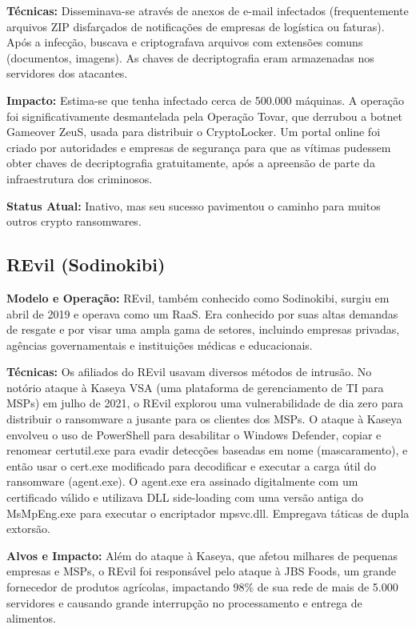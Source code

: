\textbf{Técnicas:} Disseminava-se através de anexos de e-mail infectados (frequentemente arquivos ZIP disfarçados de notificações de empresas de logística ou faturas). Após a infecção, buscava e criptografava arquivos com extensões comuns (documentos, imagens). As chaves de decriptografia eram armazenadas nos servidores dos atacantes.

\textbf{Impacto:} Estima-se que tenha infectado cerca de 500.000 máquinas. A operação foi significativamente desmantelada pela Operação Tovar, que derrubou a botnet Gameover ZeuS, usada para distribuir o CryptoLocker. Um portal online foi criado por autoridades e empresas de segurança para que as vítimas pudessem obter chaves de decriptografia gratuitamente, após a apreensão de parte da infraestrutura dos criminosos.

\textbf{Status Atual:} Inativo, mas seu sucesso pavimentou o caminho para muitos outros crypto ransomwares.

\subsection{REvil (Sodinokibi)}
\textbf{Modelo e Operação:} REvil, também conhecido como Sodinokibi, surgiu em abril de 2019 e operava como um RaaS. Era conhecido por suas altas demandas de resgate e por visar uma ampla gama de setores, incluindo empresas privadas, agências governamentais e instituições médicas e educacionais.

\textbf{Técnicas:} Os afiliados do REvil usavam diversos métodos de intrusão. No notório ataque à Kaseya VSA (uma plataforma de gerenciamento de TI para MSPs) em julho de 2021, o REvil explorou uma vulnerabilidade de dia zero para distribuir o ransomware a jusante para os clientes dos MSPs. O ataque à Kaseya envolveu o uso de PowerShell para desabilitar o Windows Defender, copiar e renomear certutil.exe para evadir detecções baseadas em nome (mascaramento), e então usar o cert.exe modificado para decodificar e executar a carga útil do ransomware (agent.exe). O agent.exe era assinado digitalmente com um certificado válido e utilizava DLL side-loading com uma versão antiga do MsMpEng.exe para executar o encriptador mpsvc.dll. Empregava táticas de dupla extorsão.

\textbf{Alvos e Impacto:} Além do ataque à Kaseya, que afetou milhares de pequenas empresas e MSPs, o REvil foi responsável pelo ataque à JBS Foods, um grande fornecedor de produtos agrícolas, impactando 98\% de sua rede de mais de 5.000 servidores e causando grande interrupção no processamento e entrega de alimentos.

